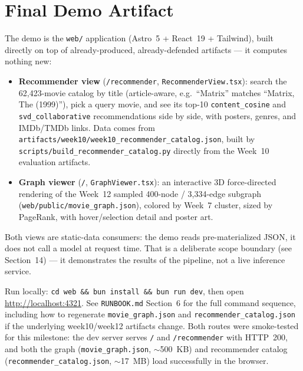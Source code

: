 \documentclass[12pt,a4paper]{article}
\begin{document}
\section{Final Demo Artifact}

The demo is the \texttt{web/} application (Astro~5 + React~19 + Tailwind), built directly on top of
already-produced, already-defended artifacts --- it computes nothing new:

\begin{itemize}[nosep]
  \item \textbf{Recommender view} (\texttt{/recommender}, \texttt{RecommenderView.tsx}): search the
    62,423-movie catalog by title (article-aware, e.g.\ ``Matrix'' matches ``Matrix, The (1999)''),
    pick a query movie, and see its top-10 \texttt{content\_cosine} and \texttt{svd\_collaborative}
    recommendations side by side, with posters, genres, and IMDb/TMDb links. Data comes from
    \texttt{artifacts/week10/week10\_recommender\_catalog.json}, built by
    \texttt{scripts/build\_recommender\_catalog.py} directly from the Week~10 evaluation artifacts.
  \item \textbf{Graph viewer} (\texttt{/}, \texttt{GraphViewer.tsx}): an interactive 3D
    force-directed rendering of the Week~12 sampled 400-node / 3,334-edge subgraph
    (\texttt{web/public/movie\_graph.json}), colored by Week~7 cluster, sized by PageRank, with
    hover/selection detail and poster art.
\end{itemize}

Both views are static-data consumers: the demo reads pre-materialized JSON, it does not call a
model at request time. That is a deliberate scope boundary (see Section~14) --- it demonstrates the
results of the pipeline, not a live inference service.

Run locally: \texttt{cd web \&\& bun install \&\& bun run dev}, then open
\url{http://localhost:4321}. See \texttt{RUNBOOK.md} Section~6 for the full command sequence,
including how to regenerate \texttt{movie\_graph.json} and \texttt{recommender\_catalog.json} if
the underlying week10/week12 artifacts change. Both routes were smoke-tested for this milestone: the
dev server serves \texttt{/} and \texttt{/recommender} with HTTP~200, and both the graph
(\texttt{movie\_graph.json}, $\sim$500~KB) and recommender catalog
(\texttt{recommender\_catalog.json}, $\sim$17~MB) load successfully in the browser.

\end{document}
